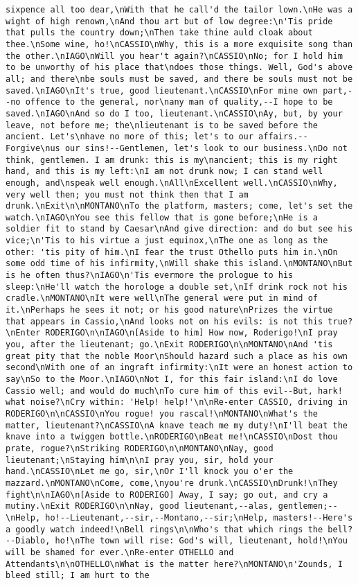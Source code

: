 \begin{verbatim}
sixpence all too dear,\nWith that he call'd the tailor lown.\nHe was a wight of high renown,\nAnd thou art but of low degree:\n'Tis pride that pulls the country down;\nThen take thine auld cloak about thee.\nSome wine, ho!\nCASSIO\nWhy, this is a more exquisite song than the other.\nIAGO\nWill you hear't again?\nCASSIO\nNo; for I hold him to be unworthy of his place that\ndoes those things. Well, God's above all; and there\nbe souls must be saved, and there be souls must not be saved.\nIAGO\nIt's true, good lieutenant.\nCASSIO\nFor mine own part,--no offence to the general, nor\nany man of quality,--I hope to be saved.\nIAGO\nAnd so do I too, lieutenant.\nCASSIO\nAy, but, by your leave, not before me; the\nlieutenant is to be saved before the ancient. Let's\nhave no more of this; let's to our affairs.--Forgive\nus our sins!--Gentlemen, let's look to our business.\nDo not think, gentlemen. I am drunk: this is my\nancient; this is my right hand, and this is my left:\nI am not drunk now; I can stand well enough, and\nspeak well enough.\nAll\nExcellent well.\nCASSIO\nWhy, very well then; you must not think then that I am drunk.\nExit\n\nMONTANO\nTo the platform, masters; come, let's set the watch.\nIAGO\nYou see this fellow that is gone before;\nHe is a soldier fit to stand by Caesar\nAnd give direction: and do but see his vice;\n'Tis to his virtue a just equinox,\nThe one as long as the other: 'tis pity of him.\nI fear the trust Othello puts him in.\nOn some odd time of his infirmity,\nWill shake this island.\nMONTANO\nBut is he often thus?\nIAGO\n'Tis evermore the prologue to his sleep:\nHe'll watch the horologe a double set,\nIf drink rock not his cradle.\nMONTANO\nIt were well\nThe general were put in mind of it.\nPerhaps he sees it not; or his good nature\nPrizes the virtue that appears in Cassio,\nAnd looks not on his evils: is not this true?\nEnter RODERIGO\n\nIAGO\n[Aside to him] How now, Roderigo!\nI pray you, after the lieutenant; go.\nExit RODERIGO\n\nMONTANO\nAnd 'tis great pity that the noble Moor\nShould hazard such a place as his own second\nWith one of an ingraft infirmity:\nIt were an honest action to say\nSo to the Moor.\nIAGO\nNot I, for this fair island:\nI do love Cassio well; and would do much\nTo cure him of this evil--But, hark! what noise?\nCry within: 'Help! help!'\n\nRe-enter CASSIO, driving in RODERIGO\n\nCASSIO\nYou rogue! you rascal!\nMONTANO\nWhat's the matter, lieutenant?\nCASSIO\nA knave teach me my duty!\nI'll beat the knave into a twiggen bottle.\nRODERIGO\nBeat me!\nCASSIO\nDost thou prate, rogue?\nStriking RODERIGO\n\nMONTANO\nNay, good lieutenant;\nStaying him\n\nI pray you, sir, hold your hand.\nCASSIO\nLet me go, sir,\nOr I'll knock you o'er the mazzard.\nMONTANO\nCome, come,\nyou're drunk.\nCASSIO\nDrunk!\nThey fight\n\nIAGO\n[Aside to RODERIGO] Away, I say; go out, and cry a mutiny.\nExit RODERIGO\n\nNay, good lieutenant,--alas, gentlemen;--\nHelp, ho!--Lieutenant,--sir,--Montano,--sir;\nHelp, masters!--Here's a goodly watch indeed!\nBell rings\n\nWho's that which rings the bell?--Diablo, ho!\nThe town will rise: God's will, lieutenant, hold!\nYou will be shamed for ever.\nRe-enter OTHELLO and Attendants\n\nOTHELLO\nWhat is the matter here?\nMONTANO\n'Zounds, I bleed still; I am hurt to the 
\end{verbatim}
